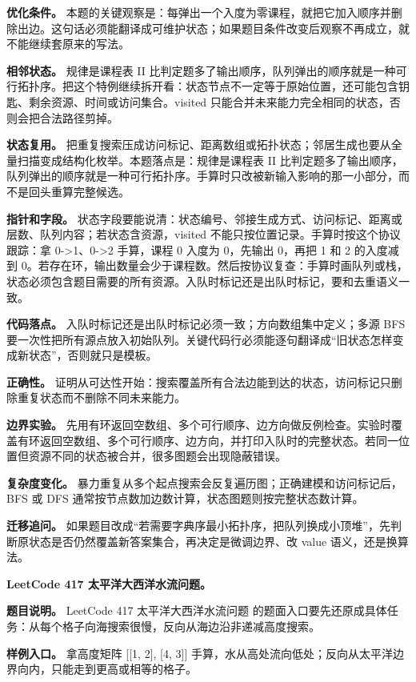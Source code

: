 \textbf{优化条件。} 本题的关键观察是：每弹出一个入度为零课程，就把它加入顺序并删除出边。这句话必须能翻译成可维护状态；如果题目条件改变后观察不再成立，就不能继续套原来的写法。

\textbf{相邻状态。} 规律是课程表 II 比判定题多了输出顺序，队列弹出的顺序就是一种可行拓扑序。把这个特例继续拆开看：状态节点不一定等于原始位置，还可能包含钥匙、剩余资源、时间或访问集合。visited 只能合并未来能力完全相同的状态，否则会把合法路径剪掉。

\textbf{状态复用。} 把重复搜索压成访问标记、距离数组或拓扑状态；邻居生成也要从全量扫描变成结构化枚举。本题落点是：规律是课程表 II 比判定题多了输出顺序，队列弹出的顺序就是一种可行拓扑序。手算时只改被新输入影响的那一小部分，而不是回头重算完整候选。

\textbf{指针和字段。} 状态字段要能说清：状态编号、邻接生成方式、访问标记、距离或层数、队列内容；若状态含资源，visited 不能只按位置记录。手算时按这个协议跟踪：拿 0->1、0->2 手算，课程 0 入度为 0，先输出 0，再把 1 和 2 的入度减到 0。若存在环，输出数量会少于课程数。然后按协议复查：手算时画队列或栈，状态必须包含题目需要的所有资源。入队时标记还是出队时标记，要和去重语义一致。

\textbf{代码落点。} 入队时标记还是出队时标记必须一致；方向数组集中定义；多源 BFS 要一次性把所有源点放入初始队列。关键代码行必须能逐句翻译成“旧状态怎样变成新状态”，否则就只是模板。

\textbf{正确性。} 证明从可达性开始：搜索覆盖所有合法边能到达的状态，访问标记只删除重复状态而不删除不同未来能力。

\textbf{边界实验。} 先用有环返回空数组、多个可行顺序、边方向做反例检查。实验时覆盖有环返回空数组、多个可行顺序、边方向，并打印入队时的完整状态。若同一位置但资源不同的状态被合并，很多图题会出现隐蔽错误。

\textbf{复杂度变化。} 暴力重复从多个起点搜索会反复遍历图；正确建模和访问标记后，BFS 或 DFS 通常按节点数加边数计算，状态图题则按完整状态数计算。

\textbf{迁移追问。} 如果题目改成“若需要字典序最小拓扑序，把队列换成小顶堆”，先判断原状态是否仍然覆盖新答案集合，再决定是微调边界、改 value 语义，还是换算法。

\noindent\textbf{LeetCode 417 太平洋大西洋水流问题。}

\textbf{题目说明。} LeetCode 417 太平洋大西洋水流问题 的题面入口要先还原成具体任务：从每个格子向海搜索很慢，反向从海边沿非递减高度搜索。

\textbf{样例入口。} 拿高度矩阵 [[1, 2], [4, 3]] 手算，水从高处流向低处；反向从太平洋边界向内，只能走到更高或相等的格子。

